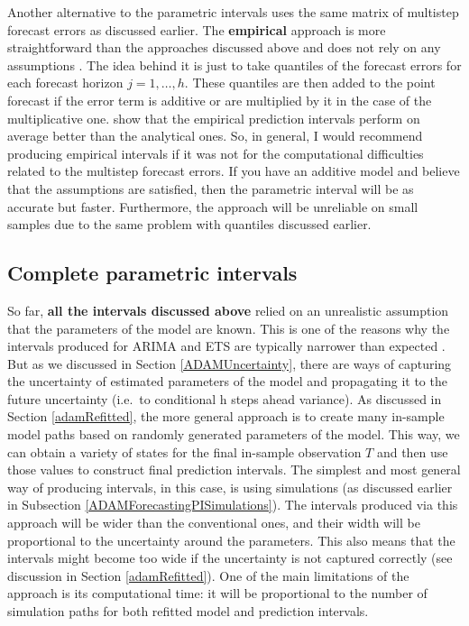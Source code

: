 \documentclass[
]{book}
\theoremstyle{definition}
\theoremstyle{definition}
\theoremstyle{definition}
\theoremstyle{definition}
\theoremstyle{remark}
\begin{document}
Another alternative to the parametric intervals uses the same matrix of multistep forecast errors as discussed earlier. The \textbf{empirical} approach is more straightforward than the approaches discussed above and does not rely on any assumptions \citep[it was discussed in][]{Lee2014}. The idea behind it is just to take quantiles of the forecast errors for each forecast horizon \(j=1,\dots,h\). These quantiles are then added to the point forecast if the error term is additive or are multiplied by it in the case of the multiplicative one. \citet{Trapero2019} show that the empirical prediction intervals perform on average better than the analytical ones. So, in general, I would recommend producing empirical intervals if it was not for the computational difficulties related to the multistep forecast errors. If you have an additive model and believe that the assumptions are satisfied, then the parametric interval will be as accurate but faster. Furthermore, the approach will be unreliable on small samples due to the same problem with quantiles discussed earlier.

\hypertarget{complete-parametric-intervals}{%
\subsection{Complete parametric intervals}\label{complete-parametric-intervals}}

So far, \textbf{all the intervals discussed above} relied on an unrealistic assumption that the parameters of the model are known. This is one of the reasons why the intervals produced for ARIMA and ETS are typically narrower than expected \citep[see, for example, results of tourism competition,][]{Athanasopoulos2011}. But as we discussed in Section \ref{ADAMUncertainty}, there are ways of capturing the uncertainty of estimated parameters of the model and propagating it to the future uncertainty (i.e.~to conditional h steps ahead variance). As discussed in Section \ref{adamRefitted}, the more general approach is to create many in-sample model paths based on randomly generated parameters of the model. This way, we can obtain a variety of states for the final in-sample observation \(T\) and then use those values to construct final prediction intervals. The simplest and most general way of producing intervals, in this case, is using simulations (as discussed earlier in Subsection \ref{ADAMForecastingPISimulations}). The intervals produced via this approach will be wider than the conventional ones, and their width will be proportional to the uncertainty around the parameters. This also means that the intervals might become too wide if the uncertainty is not captured correctly (see discussion in Section \ref{adamRefitted}). One of the main limitations of the approach is its computational time: it will be proportional to the number of simulation paths for both refitted model and prediction intervals.
\end{document}
